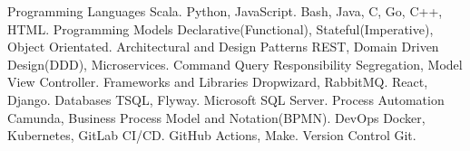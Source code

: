\begin{cvskills}
  \cvskill
    {Programming Languages} %
    {  Scala.} 
  \cvskill
    {} %
    {  Python, JavaScript. } 
  \cvskill
    {} %
    {  Bash, Java, C, Go, C++, HTML.} 
  \cvskill
    {Programming Models} %
    { Declarative(Functional), Stateful(Imperative), Object Orientated.} 
  \cvskill
    {Architectural and Design Patterns} %
    {  REST, Domain Driven Design(DDD), Microservices.}
    \cvskill
    {} %
    {  Command Query Responsibility Segregation, Model View Controller.} 
  \cvskill
    {Frameworks and Libraries} %
    {  Dropwizard, RabbitMQ.} 
  \cvskill
    {} %
    {  React, Django.} 
  \cvskill
  {Databases} %
  {  TSQL, Flyway.} 
  \cvskill
  {} %
  {  Microsoft SQL Server.} 
  \cvskill
    {Process Automation}
    { Camunda, Business Process Model and Notation(BPMN).}
  \cvskill
    {DevOps} %
    { Docker, Kubernetes, GitLab CI/CD.} %
  \cvskill
    {} %
    {  GitHub Actions, Make.} 
  \cvskill
  {Version Control} %
  { Git.} %
\end{cvskills}
